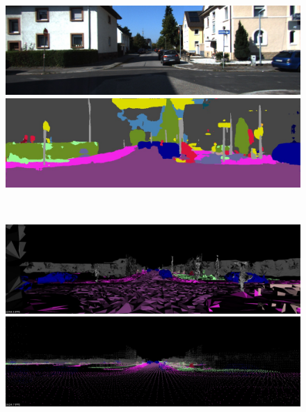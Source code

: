 \begin{figure}[htbp]
 \begin{minipage}[b]{0.50\hsize}
 \begin{center}
  \includegraphics[keepaspectratio, scale=0.18]{./picture/bgrimage/bgrimage4.jpg}
  \end{center}
 \end{minipage}
 \begin{minipage}[b]{0.5\hsize}
 \begin{center}
  \includegraphics[keepaspectratio, scale=0.18]{./picture/segimage/image4.jpg}
  \end{center}
 \end{minipage} \\
 \begin{minipage}[b]{0.50\hsize}
 \begin{center}
  \includegraphics[keepaspectratio, scale=0.18]{./picture/mesh_map_image/image4.jpg}
  \end{center}
 \end{minipage}
 \begin{minipage}[b]{0.50\hsize}
 \begin{center}
  \includegraphics[keepaspectratio, scale=0.18]{./picture/point_map_image/image4.jpg}

\end{center}
\end{minipage}
\end{figure}
